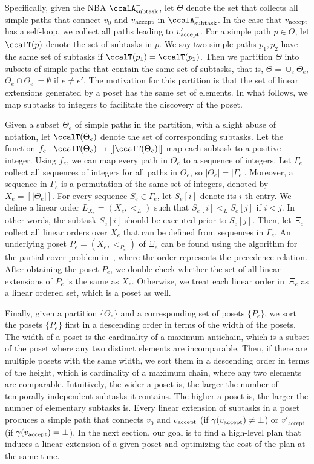 \documentclass[Afour,sageh,times]{sagej}
\newcommand{\auto}[1]{\ccalA_{\textup{#1}}}
\newcommand{\vertex}[1]{v_{\textup{#1}}}
\begin{document}
Specifically, given the NBA $\auto{subtask}^-$, let $\Theta$ denote the set that collects all simple paths that connect $v_0$ and $\vertex{accept}$ in $\auto{subtask}^-$. In the case that $\vertex{accept}$ has a self-loop, we collect all paths leading to $\vertex{accept}'$.
For a simple path $p\in\Theta$, let $\ccalT(p)$ denote the set of subtasks in $p$. We say two simple paths $p_1, p_2$ have the same set of subtasks if $\ccalT(p_1) =\ccalT(p_2)$. Then we partition $\Theta$ into subsets of  simple paths that contain the same set of subtasks, that is, $\Theta = \cup_e \Theta_e$, $\Theta_e \cap \Theta_{e'} = \emptyset$ if $e\not=e'$. The motivation for this partition is that the set of linear extensions generated by a poset has the same set of elements. {In what follows, we map subtasks to integers to facilitate the discovery of the  poset.}

Given a subset $\Theta_e$ of simple paths in the partition, with a slight abuse of notation, let $\ccalT(\Theta_e)$ denote the set of corresponding  subtasks. Let the function $f_e:\ccalT(\Theta_e)\to [|\ccalT(\Theta_e)|]$ map each subtask to a positive integer. Using $f_e$, we can map every path in $\Theta_e$ to a sequence of integers. Let $\Gamma_e$ collect all sequences of integers for all paths in $\Theta_e$, so $|\Theta_e| =  |\Gamma_e|$. Moreover, a sequence in $\Gamma_e$ is a permutation of the same set of integers, denoted by $X_e = [|\Theta_e|]$. For every sequence $S_e \in \Gamma_e$, let $S_e[i]$ denote its $i$-th entry. We define a linear order $L_{X_e} = (X_e, <_L)$ such that  $S_e[i]  <_L  S_e[j] $ if $i  <  j$. In other words, the subtask $S_e[i]$ should be executed prior to  $S_e[j]$. Then, let $\Xi_e$ collect all linear orders over $X_e$ that can be defined from sequences in $\Gamma_e$. An underlying poset $P_e  = (X_e, <_{P_e})$ of $\Xi_e$ can be found using the algorithm for the partial cover problem in~\cite{heath2013poset}, where the order represents the precedence relation. After obtaining the poset $P_e$, we double check whether the set of all linear extensions of $P_e$ is the same as $X_e$. Otherwise, we treat each linear order in~$\Xi_e$ as a linear ordered set, which is a poset as well.

{Finally, given a partition $\{\Theta_e\}$ and a corresponding set of posets $\{P_e\}$, we sort the posets  $\{P_e\}$ first in a descending order in terms of the width of the posets. The width of a poset  is the cardinality of a maximum antichain, which is a subset of the poset where any two distinct elements are incomparable. Then, if there are multiple posets with the same width, we sort them in a descending order in terms of the height, which is cardinality of a maximum chain, where any two elements are comparable. Intuitively, the wider a poset is, the larger the number of temporally independent subtasks it contains. The higher a poset is, the  larger the number of elementary subtasks is.} Every linear extension of subtasks in a poset produces a simple path that connects $v_0$ and $\vertex{accept}$ (if $\gamma(\vertex{accept}) \neq \bot$) or $v'_{\text{accept}}$ (if $\gamma(\vertex{accept}) = \bot$). In the next section, our goal is to find a high-level plan that induces a linear extension of a given poset and optimizing the cost of the plan at the same time.
\end{document}

